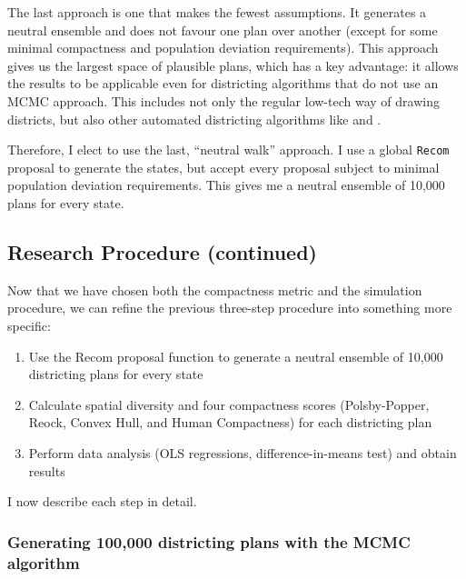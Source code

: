 \documentclass[]{article}
\providecommand{\tightlist}{%
  \setlength{\itemsep}{0pt}\setlength{\parskip}{0pt}}
\begin{document}
The last approach is one that makes the fewest assumptions. It generates
a neutral ensemble and does not favour one plan over another (except for
some minimal compactness and population deviation requirements). This
approach gives us the largest space of plausible plans, which has a key
advantage: it allows the results to be applicable even for districting
algorithms that do not use an MCMC approach. This includes not only the
regular low-tech way of drawing districts, but also other automated
districting algorithms like \cite{mm2018} and \cite{lf2019}.

Therefore, I elect to use the last, ``neutral walk'' approach. I use a
global \texttt{Recom} proposal to generate the states, but accept every
proposal subject to minimal population deviation requirements. This
gives me a neutral ensemble of 10,000 plans for every state.

\hypertarget{research-procedure-continued}{%
\subsection{Research Procedure
(continued)}\label{research-procedure-continued}}

Now that we have chosen both the compactness metric and the simulation
procedure, we can refine the previous three-step procedure into
something more specific:

\begin{enumerate}
\def\labelenumi{\arabic{enumi}.}
\tightlist
\item
  Use the Recom proposal function to generate a neutral ensemble of
  10,000 districting plans for every state
\item
  Calculate spatial diversity and four compactness scores
  (Polsby-Popper, Reock, Convex Hull, and Human Compactness) for each
  districting plan
\item
  Perform data analysis (OLS regressions, difference-in-means test) and
  obtain results
\end{enumerate}

I now describe each step in detail.

\hypertarget{generating-100000-districting-plans-with-the-mcmc-algorithm}{%
\subsubsection{Generating 100,000 districting plans with the MCMC
algorithm}\label{generating-100000-districting-plans-with-the-mcmc-algorithm}}
\end{document}
